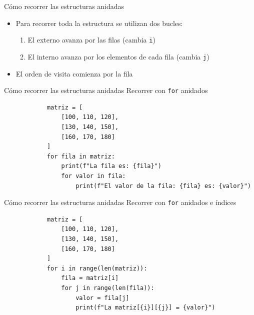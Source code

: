 \documentclass{beamer}
\begin{document}
    \begin{frame}[fragile, t]{Cómo recorrer las estructuras anidadas}
        \begin{itemize}
            \item Para recorrer toda la estructura se utilizan dos bucles:
            \begin{enumerate}
                \item El externo avanza por las filas (cambia \texttt{i})
                \item El interno avanza por los elementos de cada fila (cambia \texttt{j})
            \end{enumerate}
            \item El orden de visita comienza por la fila
        \end{itemize}
    \end{frame}

    \begin{frame}[fragile, t]{Cómo recorrer las estructuras anidadas}
        Recorrer con \texttt{for} anidados
        \begin{verbatim}
            matriz = [
                [100, 110, 120], 
                [130, 140, 150], 
                [160, 170, 180]
            ]
            for fila in matriz:
                print(f"La fila es: {fila}")
                for valor in fila:
                    print(f"El valor de la fila: {fila} es: {valor}")
        \end{verbatim}
    \end{frame}

    \begin{frame}[fragile, t]{Cómo recorrer las estructuras anidadas}
        Recorrer con \texttt{for} anidados e índices
        \begin{verbatim}
            matriz = [
                [100, 110, 120], 
                [130, 140, 150], 
                [160, 170, 180]
            ]
            for i in range(len(matriz)):
                fila = matriz[i]
                for j in range(len(fila)):
                    valor = fila[j]
                    print(f"La matriz[{i}][{j}] = {valor}")
            \end{verbatim}
    \end{frame}
\end{document}
